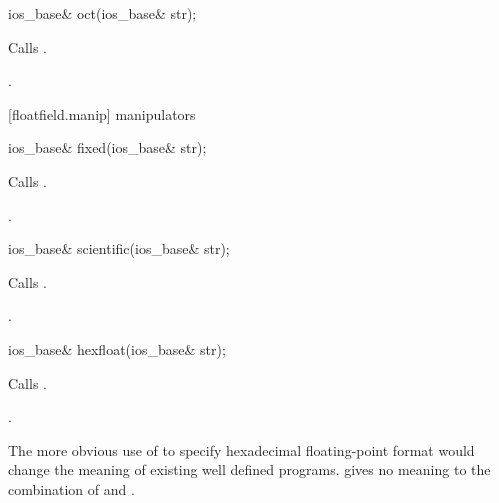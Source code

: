 %
\begin{itemdecl}
ios_base& oct(ios_base& str);
\end{itemdecl}

\begin{itemdescr}
\pnum
\effects
Calls
.

\pnum
\returns
{}.
\end{itemdescr}

[floatfield.manip]{ manipulators}

%
\begin{itemdecl}
ios_base& fixed(ios_base& str);
\end{itemdecl}

\begin{itemdescr}
\pnum
\effects
Calls
.

\pnum
\returns
{}.
\end{itemdescr}

%
\begin{itemdecl}
ios_base& scientific(ios_base& str);
\end{itemdecl}

\begin{itemdescr}
\pnum
\effects
Calls
.

\pnum
\returns
{}.
\end{itemdescr}

%
\begin{itemdecl}
ios_base& hexfloat(ios_base& str);
\end{itemdecl}

\begin{itemdescr}
\pnum\effects Calls .

\pnum\returns {}.
\end{itemdescr}

\pnum
\begin{note} The more obvious use of
 to specify hexadecimal floating-point format would
change the meaning of existing well defined programs. \CppIII
gives no meaning to the combination of  and
.\end{note}

